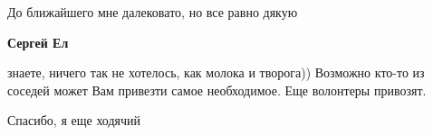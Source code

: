 \begin{itemize}
\begin{itemize}
\begin{itemize}
До ближайшего мне далековато, но все равно дякую

\textbf{Сергей Ел} 

знаете, ничего так не хотелось, как молока и творога)) Возможно кто-то из
соседей может Вам привезти самое необходимое. Еще волонтеры привозят.


Спасибо, я еще ходячий

\end{itemize} %

\end{itemize} %


\end{itemize} %
